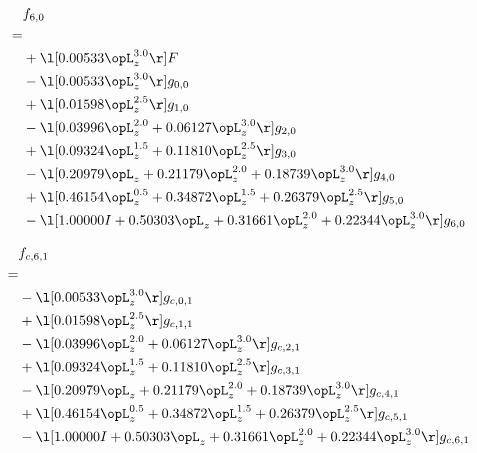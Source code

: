 \begin{alignat}{2} 
\label{eq:f_60_0} 
& f_{6,0} \nonumber \\ 
 = \\ 
& + \l[  0.00533 \opL_z^{3.0}  \r] F \nonumber \\ 
& - \l[  0.00533 \opL_z^{3.0}  \r] g_{0,0} \nonumber \\ 
& + \l[  0.01598 \opL_z^{2.5}  \r] g_{1,0} \nonumber \\ 
& - \l[  0.03996 \opL_z^{2.0} +  0.06127 \opL_z^{3.0}  \r] g_{2,0} \nonumber \\ 
& + \l[  0.09324 \opL_z^{1.5} +  0.11810 \opL_z^{2.5}  \r] g_{3,0} \nonumber \\ 
& - \l[  0.20979 \opL_z +  0.21179 \opL_z^{2.0} +  0.18739 \opL_z^{3.0}  \r] g_{4,0} \nonumber \\ 
& + \l[  0.46154 \opL_z^{0.5} +  0.34872 \opL_z^{1.5} +  0.26379 \opL_z^{2.5}  \r] g_{5,0} \nonumber \\ 
& - \l[  1.00000 I +  0.50303 \opL_z +  0.31661 \opL_z^{2.0} +  0.22344 \opL_z^{3.0}  \r] g_{6,0} \nonumber \\ 
\end{alignat} 


\begin{alignat}{2} 
\label{eq:f_61_0} 
& f_{c,6,1} \nonumber \\ 
 = \\ 
& - \l[  0.00533 \opL_z^{3.0}  \r] g_{c,0,1} \nonumber \\ 
& + \l[  0.01598 \opL_z^{2.5}  \r] g_{c,1,1} \nonumber \\ 
& - \l[  0.03996 \opL_z^{2.0} +  0.06127 \opL_z^{3.0}  \r] g_{c,2,1} \nonumber \\ 
& + \l[  0.09324 \opL_z^{1.5} +  0.11810 \opL_z^{2.5}  \r] g_{c,3,1} \nonumber \\ 
& - \l[  0.20979 \opL_z +  0.21179 \opL_z^{2.0} +  0.18739 \opL_z^{3.0}  \r] g_{c,4,1} \nonumber \\ 
& + \l[  0.46154 \opL_z^{0.5} +  0.34872 \opL_z^{1.5} +  0.26379 \opL_z^{2.5}  \r] g_{c,5,1} \nonumber \\ 
& - \l[  1.00000 I +  0.50303 \opL_z +  0.31661 \opL_z^{2.0} +  0.22344 \opL_z^{3.0}  \r] g_{c,6,1} \nonumber \\ 
\end{alignat} 


